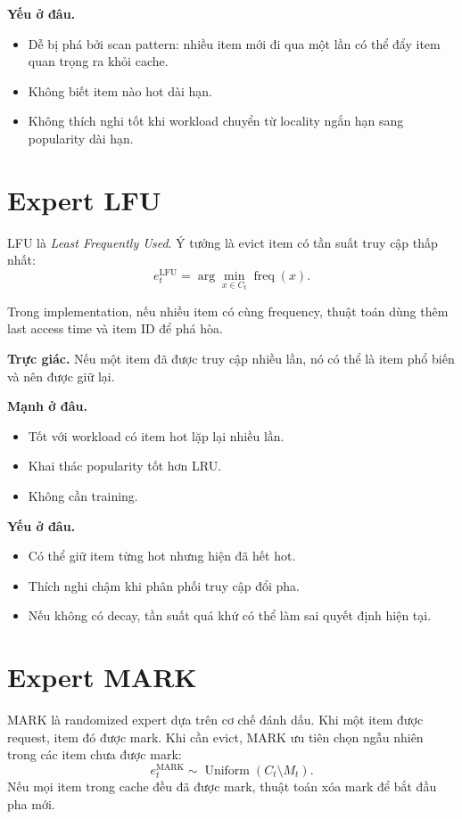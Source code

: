 \documentclass[11pt,a4paper]{article}
\begin{document}
\textbf{Yếu ở đâu.}
\begin{itemize}[leftmargin=1.4em]
    \item Dễ bị phá bởi scan pattern: nhiều item mới đi qua một lần có thể đẩy item quan trọng ra khỏi cache.
    \item Không biết item nào hot dài hạn.
    \item Không thích nghi tốt khi workload chuyển từ locality ngắn hạn sang popularity dài hạn.
\end{itemize}

\section{Expert LFU}

LFU là \emph{Least Frequently Used}. Ý tưởng là evict item có tần suất truy cập thấp nhất:
\[
    e_t^{\mathrm{LFU}}
    =
    \arg\min_{x\in C_t}\operatorname{freq}(x).
\]

Trong implementation, nếu nhiều item có cùng frequency, thuật toán dùng thêm last access time và item ID để phá hòa.

\textbf{Trực giác.} Nếu một item đã được truy cập nhiều lần, nó có thể là item phổ biến và nên được giữ lại.

\textbf{Mạnh ở đâu.}
\begin{itemize}[leftmargin=1.4em]
    \item Tốt với workload có item hot lặp lại nhiều lần.
    \item Khai thác popularity tốt hơn LRU.
    \item Không cần training.
\end{itemize}

\textbf{Yếu ở đâu.}
\begin{itemize}[leftmargin=1.4em]
    \item Có thể giữ item từng hot nhưng hiện đã hết hot.
    \item Thích nghi chậm khi phân phối truy cập đổi pha.
    \item Nếu không có decay, tần suất quá khứ có thể làm sai quyết định hiện tại.
\end{itemize}

\section{Expert MARK}

MARK là randomized expert dựa trên cơ chế đánh dấu. Khi một item được request, item đó được mark. Khi cần evict, MARK ưu tiên chọn ngẫu nhiên trong các item chưa được mark:
\[
    e_t^{\mathrm{MARK}}
    \sim
    \operatorname{Uniform}(C_t\setminus M_t).
\]
Nếu mọi item trong cache đều đã được mark, thuật toán xóa mark để bắt đầu pha mới.
\end{document}
